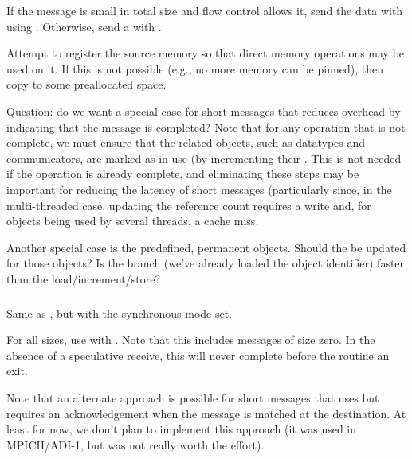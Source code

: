 \documentclass{article}
\begin{document}
\subsubsection{}
\begin{adi3}
\begin{mmadi}
\\
\\
\begin{core}
If the message is small in total size and flow control allows it, send
the data with  using .
Otherwise, send a  with
.  
\end{core}
\begin{via}
Attempt to register the source memory so that direct memory operations may be
used on it.  If this is not possible (e.g., no more memory can be pinned),
then copy to some preallocated space.
\end{via}
\end{mmadi}
\end{adi3}

Question: do we want a special case for short messages that reduces
overhead by indicating that the message is completed?  Note that for
any operation that is not complete, we must ensure that the related
objects, such as datatypes and communicators, are marked as in use (by
incrementing their .  This is not needed if
the operation is already complete, and eliminating these steps may be
important for reducing the latency of short messages (particularly
since, in the multi-threaded case, updating the reference count
requires a write and, for objects being used by several threads, a
cache miss.

Another special case is the predefined, permanent objects.  Should the
 be updated for those objects?  Is the
branch (we've already loaded the object identifier) faster than the
load/increment/store?  

\subsubsection{}
Same as , but with the synchronous mode set.  

\begin{core}
For all sizes, use  with
.  Note that this includes messages of size zero.
In the absence of a speculative receive, this will never complete
before the routine an exit.

\end{core}
Note that an alternate approach is possible for short messages that uses
 but requires an acknowledgement when the message is
matched at the destination.  At least for now, we don't plan to implement this
approach (it was used in MPICH/ADI-1, but was not really worth the effort). 
\end{document}
